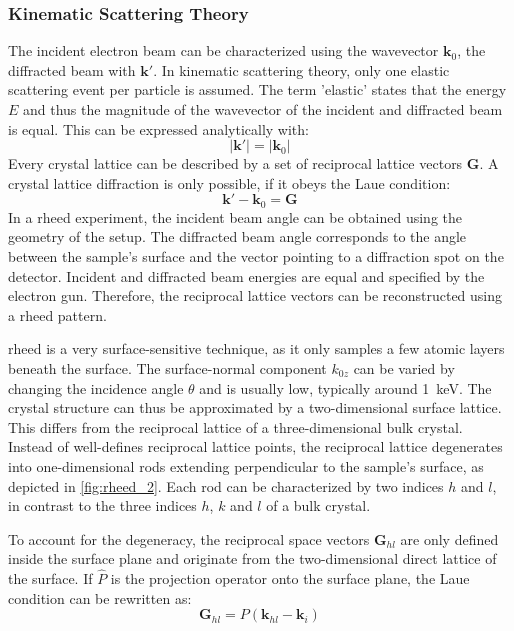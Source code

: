 \subsubsection{Kinematic Scattering Theory}
The incident electron beam can be characterized using the wavevector $\mathbf{k}_{0}$,
the diffracted beam with $\mathbf{k}'$.
In kinematic scattering theory, only one elastic scattering event per particle is 
assumed. 
The term 'elastic' states that the energy $E$ and thus the magnitude of the wavevector
of the incident and diffracted beam is equal.
This can be expressed analytically with:
\begin{equation}
	\lvert \mathbf{k}' \rvert=\lvert \mathbf{k}_{0} \rvert
\end{equation}
Every crystal lattice can be described by a set of reciprocal lattice vectors
$\mathbf{G}$. 
A crystal lattice diffraction is only possible, if it obeys the Laue condition:
\begin{equation}
\mathbf{k}'-\mathbf{k}_{0}=\mathbf{G}
\end{equation}
In a \ac{rheed} experiment, the incident beam angle can be obtained using the 
geometry of the setup.
The diffracted beam angle corresponds to the angle between the sample's surface  and the 
vector pointing to a diffraction spot on the detector. 
Incident and diffracted beam energies are equal and specified by the electron gun.
Therefore, the reciprocal lattice vectors can be reconstructed using a \ac{rheed} 
pattern. 

\ac{rheed} is a very surface-sensitive technique, as it only samples a few atomic layers 
beneath the surface.
The surface-normal component $k_{0z}$ can be varied by changing the incidence angle 
$\theta$ and is usually low, typically around \qty{1}{\kilo \electronvolt}.
The crystal structure can thus be approximated by a two-dimensional surface lattice.
This differs from the reciprocal lattice of a three-dimensional bulk crystal.
Instead of well-defines reciprocal lattice points, the reciprocal lattice degenerates 
into one-dimensional rods extending perpendicular to the sample's surface, as depicted 
in \cref{fig:rheed_2}.
Each rod can be characterized by two indices $h$ and $l$, in contrast to the three 
indices $h$, $k$ and $l$ of a bulk crystal.

To account for the degeneracy, the reciprocal space vectors $\mathbf{G}_{hl}$ are only 
defined inside the surface plane and originate from the two-dimensional direct lattice
of the surface. 
If $\hat{P}$ is the projection operator onto the surface plane, the Laue condition can 
be rewritten as:
\begin{equation}
	\mathbf{G}_{hl}=P(\mathbf{k}_{hl}-\mathbf{k}_{i})
\end{equation}

